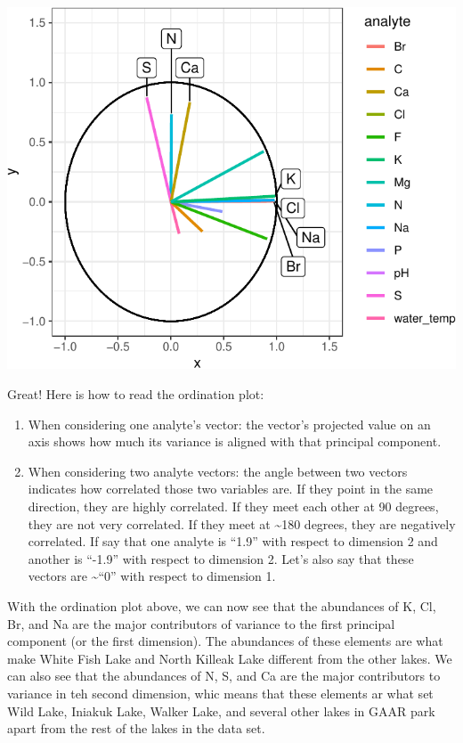 \documentclass[
]{krantz}
\begin{document}
\begin{center}\includegraphics{index_files/figure-latex/unnamed-chunk-97-1} \end{center}

Great! Here is how to read the ordination plot:

\begin{enumerate}
\def\labelenumi{\arabic{enumi}.}
\item
  When considering one analyte's vector: the vector's projected value on an axis shows how much its variance is aligned with that principal component.
\item
  When considering two analyte vectors: the angle between two vectors indicates how correlated those two variables are. If they point in the same direction, they are highly correlated. If they meet each other at 90 degrees, they are not very correlated. If they meet at \textasciitilde180 degrees, they are negatively correlated. If say that one analyte is ``1.9'' with respect to dimension 2 and another is ``-1.9'' with respect to dimension 2. Let's also say that these vectors are \textasciitilde{}``0'' with respect to dimension 1.
\end{enumerate}

With the ordination plot above, we can now see that the abundances of K, Cl, Br, and Na are the major contributors of variance to the first principal component (or the first dimension). The abundances of these elements are what make White Fish Lake and North Killeak Lake different from the other lakes. We can also see that the abundances of N, S, and Ca are the major contributors to variance in teh second dimension, whic means that these elements ar what set Wild Lake, Iniakuk Lake, Walker Lake, and several other lakes in GAAR park apart from the rest of the lakes in the data set.
\end{document}
